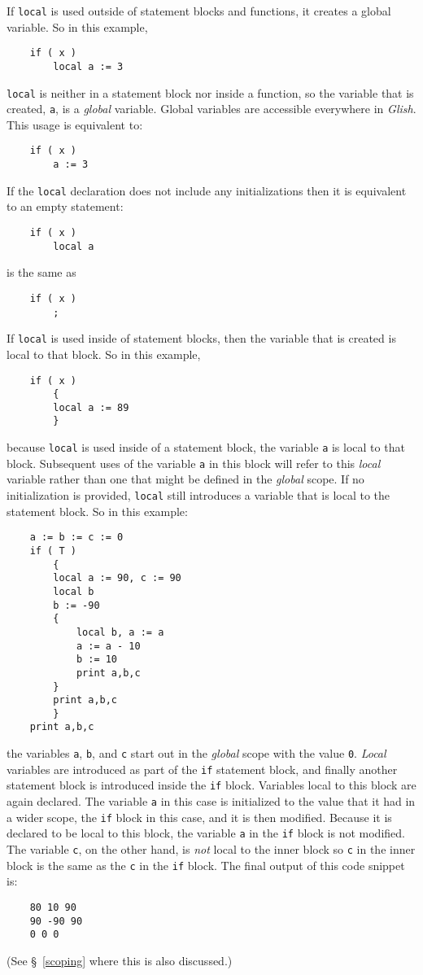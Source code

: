 If {\tt local} is used outside of statement blocks and functions,
it creates a global variable. So in this example,
\begin{verbatim}
    if ( x )
        local a := 3
\end{verbatim}
{\tt local} is neither in a statement block nor  inside
a function, so the variable that is created, {\tt a}, is a {\em global}
variable.  Global variables are accessible everywhere in {\em Glish}. 
This usage is
equivalent to:
\begin{verbatim}
    if ( x )
        a := 3
\end{verbatim}
If the {\tt local} declaration does not include any initializations
then it is equivalent to an empty statement:
\begin{verbatim}
    if ( x )
        local a
\end{verbatim}
is the same as
\begin{verbatim}
    if ( x )
        ;
\end{verbatim}
If {\tt local} is used inside of statement blocks, then the variable that is
created is local to that block. So in this example,
\begin{verbatim}
    if ( x )
        {
        local a := 89
        }
\end{verbatim}
because {\tt local} is used inside of a statement block, the variable {\tt a} is
local to that block. Subsequent uses of the variable {\tt a} in this block will
refer to this {\em local} variable rather than one that might be defined in the
{\em global} scope. If no initialization is provided, {\tt local} still
introduces a variable that is local to the statement block. So in this example:
\begin{verbatim}
    a := b := c := 0
    if ( T )
        {
        local a := 90, c := 90
        local b
        b := -90
        {
            local b, a := a
            a := a - 10
            b := 10
            print a,b,c
        }
        print a,b,c
        }
    print a,b,c
\end{verbatim}
the variables {\tt a}, {\tt b}, and {\tt c} start out in the {\em global} scope
with the value {\tt 0}. {\em Local} variables are introduced as part
of the {\tt if}
statement block, and finally another statement block is introduced inside the
{\tt if} block. Variables local to this block are again declared. The variable
{\tt a} in this case is initialized to the value that it had in a wider scope,
the {\tt if} block in this case, and it is then modified. Because it is declared
to be local to this block, the variable {\tt a} in 
the {\tt if} block is not modified.
The variable {\tt c}, on the other hand, is {\em not} local to the inner block so
{\tt c} in the inner block is the same as the {\tt c} in the {\tt if} block.
The final output of this code snippet is:
\begin{verbatim}
    80 10 90
    90 -90 90
    0 0 0
\end{verbatim}
(See  \S~\ref{scoping} where this is also discussed.)

